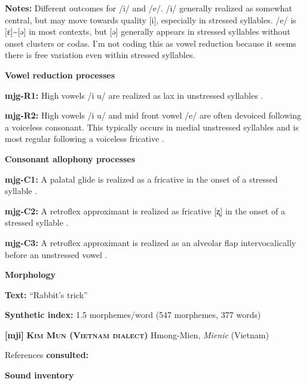 \textbf{Notes:} Different outcomes for /i/ and /e/. /i/ generally realized as somewhat central, but may move towards quality [i], especially in stressed syllables. /e/ is [ɛ]{\textasciitilde}[ə] in most contexts, but [ə] generally appears in stressed syllables without onset clusters or codas. I’m not coding this as vowel reduction because it seems there is free variation even within stressed syllables.



\textbf{Vowel reduction processes}



\textbf{mjg-R1:} High vowels /i u/ are realized as lax in unstressed syllables \citep[35]{Slater2003}.



\textbf{mjg-R2:} High vowels /i u/ and mid front vowel /e/ are often devoiced following a voiceless consonant. This typically occurs in medial unstressed syllables and is most regular following a voiceless fricative \citep[36]{Slater2003}.



\textbf{Consonant allophony processes}



\textbf{mjg-C1:} A palatal glide is realized as a fricative in the onset of a stressed syllable \citep[31-2]{Slater2003}.



\textbf{mjg-C2:} A retroflex approximant is realized as fricative [ʐ] in the onset of a stressed syllable \citep[30]{Slater2003}.



\textbf{mjg-C3:} A retroflex approximant is realized as an alveolar flap intervocalically before an unstressed vowel \citep[31]{Slater2003}.



\textbf{Morphology}



\textbf{Text:} “Rabbit’s trick” \citep[343-350]{Slater2003}



\textbf{Synthetic index:} 1.5 morphemes/word (547 morphemes, 377 words)



\textbf{[mji]}   \textbf{\textsc{Kim Mun (Vietnam dialect)}}  Hmong-Mien, \textit{Mienic} (Vietnam)



References \textbf{consulted:} \citet{Clark2008}



\textbf{Sound inventory}



